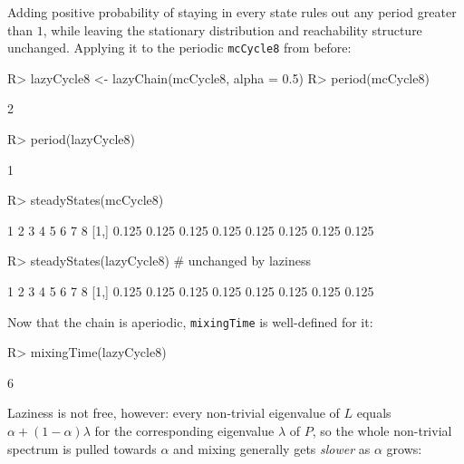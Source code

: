 \documentclass[
  nojss]{jss}
\begin{document}
Adding positive probability of staying in every state rules out any period
greater than \(1\), while leaving the stationary distribution and reachability
structure unchanged. Applying it to the periodic \texttt{mcCycle8} from before:

\begin{CodeChunk}
\begin{CodeInput}
R> lazyCycle8 <- lazyChain(mcCycle8, alpha = 0.5)
R> period(mcCycle8)
\end{CodeInput}
\begin{CodeOutput}
[1] 2
\end{CodeOutput}
\begin{CodeInput}
R> period(lazyCycle8)
\end{CodeInput}
\begin{CodeOutput}
[1] 1
\end{CodeOutput}
\begin{CodeInput}
R> steadyStates(mcCycle8)
\end{CodeInput}
\begin{CodeOutput}
         1     2     3     4     5     6     7     8
[1,] 0.125 0.125 0.125 0.125 0.125 0.125 0.125 0.125
\end{CodeOutput}
\begin{CodeInput}
R> steadyStates(lazyCycle8) # unchanged by laziness
\end{CodeInput}
\begin{CodeOutput}
         1     2     3     4     5     6     7     8
[1,] 0.125 0.125 0.125 0.125 0.125 0.125 0.125 0.125
\end{CodeOutput}
\end{CodeChunk}

Now that the chain is aperiodic, \texttt{mixingTime} is well-defined for it:

\begin{CodeChunk}
\begin{CodeInput}
R> mixingTime(lazyCycle8)
\end{CodeInput}
\begin{CodeOutput}
[1] 6
\end{CodeOutput}
\end{CodeChunk}

Laziness is not free, however: every non-trivial eigenvalue of \(L\) equals
\(\alpha+(1-\alpha)\lambda\) for the corresponding eigenvalue \(\lambda\) of
\(P\), so the whole non-trivial spectrum is pulled towards \(\alpha\) and mixing
generally gets \emph{slower} as \(\alpha\) grows:
\end{document}
